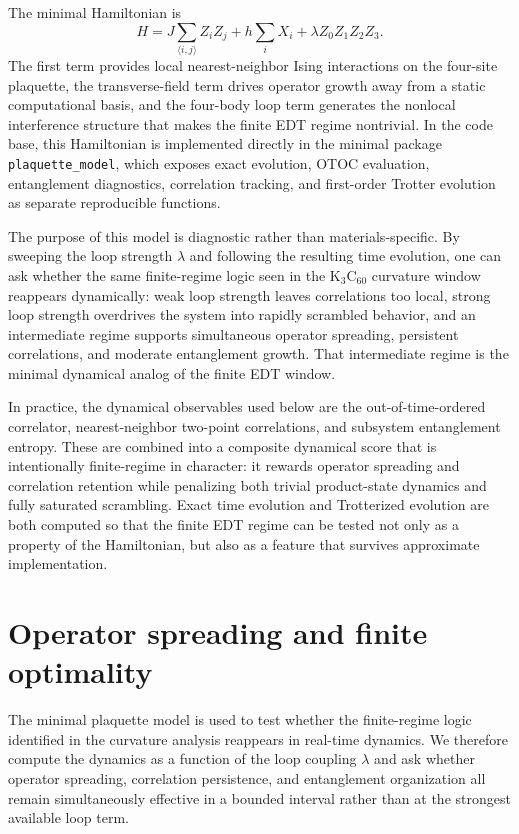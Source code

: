 \documentclass[twocolumn,10pt]{article}
\begin{document}
The minimal Hamiltonian is
\begin{equation}
H =
J \sum_{\langle i,j\rangle} Z_i Z_j
+
h \sum_i X_i
+
\lambda Z_0 Z_1 Z_2 Z_3.
\end{equation}
The first term provides local nearest-neighbor Ising interactions on the four-site plaquette, the transverse-field term drives operator growth away from a static computational basis, and the four-body loop term generates the nonlocal interference structure that makes the finite EDT regime nontrivial. In the code base, this Hamiltonian is implemented directly in the minimal package \texttt{plaquette\_model}, which exposes exact evolution, OTOC evaluation, entanglement diagnostics, correlation tracking, and first-order Trotter evolution as separate reproducible functions.

The purpose of this model is diagnostic rather than materials-specific. By sweeping the loop strength $\lambda$ and following the resulting time evolution, one can ask whether the same finite-regime logic seen in the K$_3$C$_{60}$ curvature window reappears dynamically: weak loop strength leaves correlations too local, strong loop strength overdrives the system into rapidly scrambled behavior, and an intermediate regime supports simultaneous operator spreading, persistent correlations, and moderate entanglement growth. That intermediate regime is the minimal dynamical analog of the finite EDT window.

In practice, the dynamical observables used below are the out-of-time-ordered correlator, nearest-neighbor two-point correlations, and subsystem entanglement entropy. These are combined into a composite dynamical score that is intentionally finite-regime in character: it rewards operator spreading and correlation retention while penalizing both trivial product-state dynamics and fully saturated scrambling. Exact time evolution and Trotterized evolution are both computed so that the finite EDT regime can be tested not only as a property of the Hamiltonian, but also as a feature that survives approximate implementation.


\section{Operator spreading and finite optimality}

The minimal plaquette model is used to test whether the finite-regime logic identified in the curvature analysis reappears in real-time dynamics. We therefore compute the dynamics as a function of the loop coupling $\lambda$ and ask whether operator spreading, correlation persistence, and entanglement organization all remain simultaneously effective in a bounded interval rather than at the strongest available loop term.
\end{document}
